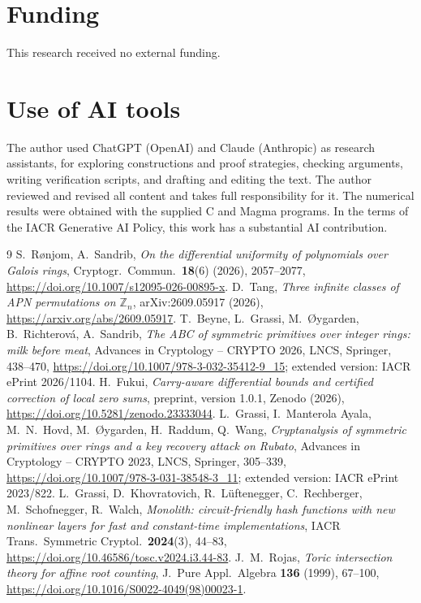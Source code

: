 \documentclass[11pt]{amsart}
\theoremstyle{definition}
\begin{document}
\section*{Funding}
This research received no external funding.

\section*{Use of AI tools}
The author used ChatGPT (OpenAI) and Claude (Anthropic) as research assistants, for exploring constructions and proof strategies,
checking arguments, writing verification scripts, and drafting and editing the text. The author reviewed and revised all content
and takes full responsibility for it. The numerical results were obtained with the supplied C and Magma programs.
In the terms of the IACR Generative AI Policy, this work has a substantial AI contribution.

\begin{thebibliography}{9}
 S.~R{\o}njom, A.~Sandrib, \emph{On the differential uniformity of polynomials over Galois rings}, Cryptogr.\ Commun.\
\textbf{18}(6) (2026), 2057--2077, \url{https://doi.org/10.1007/s12095-026-00895-x}.
\bibitem{Tang} D.~Tang, \emph{Three infinite classes of APN permutations on $\mathbb Z_n$}, arXiv:2609.05917 (2026), \url{https://arxiv.org/abs/2609.05917}.
\bibitem{BGORS} T.~Beyne, L.~Grassi, M.~{\O}ygarden, B.~Richterov\'a, A.~Sandrib, \emph{The ABC of symmetric primitives over integer rings:
milk before meat}, Advances in Cryptology -- CRYPTO 2026, LNCS, Springer, 438--470, \url{https://doi.org/10.1007/978-3-032-35412-9_15};
extended version: IACR ePrint 2026/1104.
 H.~Fukui, \emph{Carry-aware differential bounds and certified correction of local zero sums}, preprint, version 1.0.1,
Zenodo (2026), \url{https://doi.org/10.5281/zenodo.23333044}.
 L.~Grassi, I.~Manterola Ayala, M.~N.~Hovd, M.~{\O}ygarden, H.~Raddum, Q.~Wang, \emph{Cryptanalysis of symmetric
primitives over rings and a key recovery attack on Rubato}, Advances in Cryptology -- CRYPTO 2023, LNCS, Springer, 305--339,
\url{https://doi.org/10.1007/978-3-031-38548-3_11}; extended version: IACR ePrint 2023/822.
\bibitem{Monolith} L.~Grassi, D.~Khovratovich, R.~L\"uftenegger, C.~Rechberger, M.~Schofnegger, R.~Walch, \emph{Monolith:
circuit-friendly hash functions with new nonlinear layers for fast and constant-time implementations}, IACR Trans.\ Symmetric
Cryptol.\ \textbf{2024}(3), 44--83, \url{https://doi.org/10.46586/tosc.v2024.i3.44-83}.
\bibitem{Rojas} J.~M.~Rojas, \emph{Toric intersection theory for affine root counting}, J.\ Pure Appl.\ Algebra \textbf{136} (1999), 67--100, \url{https://doi.org/10.1016/S0022-4049(98)00023-1}.
\end{thebibliography}
\end{document}
